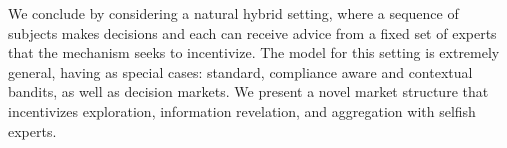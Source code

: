 We conclude by considering a natural hybrid setting, where a sequence of subjects makes decisions and each can receive advice from a fixed set of experts that the mechanism seeks to incentivize. 
The model for this setting is extremely general, having as special cases: standard, compliance aware and contextual bandits, as well as decision markets.
We present a novel market structure that incentivizes exploration, information revelation, and aggregation with selfish experts.


